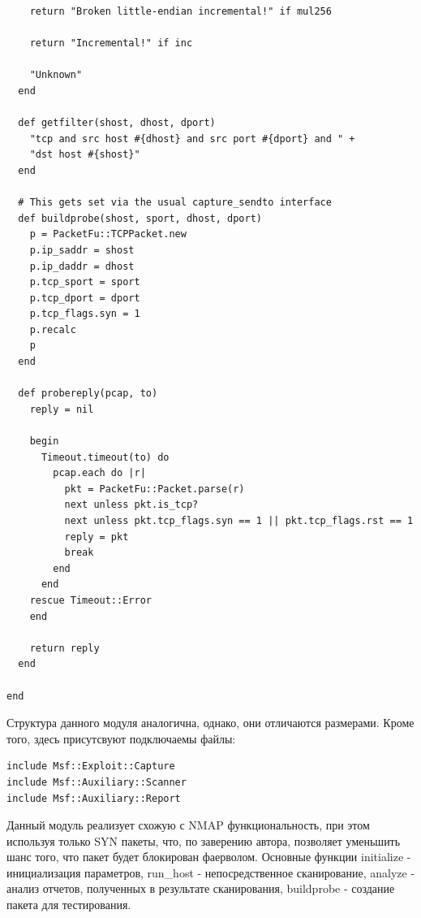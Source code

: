 \documentclass[10pt,a4paper]{article}
\begin{document}
\begin{lstlisting}
    return "Broken little-endian incremental!" if mul256

    return "Incremental!" if inc

    "Unknown"
  end

  def getfilter(shost, dhost, dport)
    "tcp and src host #{dhost} and src port #{dport} and " +
    "dst host #{shost}"
  end

  # This gets set via the usual capture_sendto interface
  def buildprobe(shost, sport, dhost, dport)
    p = PacketFu::TCPPacket.new
    p.ip_saddr = shost
    p.ip_daddr = dhost
    p.tcp_sport = sport
    p.tcp_dport = dport
    p.tcp_flags.syn = 1
    p.recalc
    p
  end

  def probereply(pcap, to)
    reply = nil

    begin
      Timeout.timeout(to) do
        pcap.each do |r|
          pkt = PacketFu::Packet.parse(r)
          next unless pkt.is_tcp?
          next unless pkt.tcp_flags.syn == 1 || pkt.tcp_flags.rst == 1
          reply = pkt
          break
        end
      end
    rescue Timeout::Error
    end

    return reply
  end

end

\end{lstlisting}

Структура данного модуля аналогична, однако, они отличаются размерами. Кроме того, здесь присутсвуют подключаемы файлы:

\begin{verbatim}
include Msf::Exploit::Capture
include Msf::Auxiliary::Scanner
include Msf::Auxiliary::Report
\end{verbatim}

Данный модуль реализует схожую с NMAP функциональность, при этом используя только SYN пакеты, что, по заверению автора, позволяет уменьшить шанс того, что пакет будет блокирован фаерволом. Основные функции initialize - инициализация параметров, run_host - непосредственное сканирование, analyze - анализ отчетов, полученных в результате сканирования, buildprobe - создание пакета для тестирования.
\end{document}
